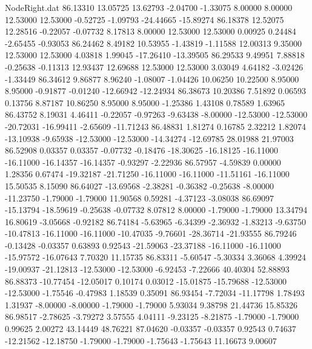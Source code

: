 \begin{filecontents}{NodeRight.dat}
  86.13310   13.05725   13.62793    -2.04700   -1.33075    8.00000    8.00000   12.53000   12.53000   -0.52725   -1.09793  -24.44665  -15.89274
  86.18378   12.52075   12.28516    -0.22057   -0.07732    8.17813    8.00000   12.53000   12.53000    0.00925    0.24484   -2.65455   -0.93053
  86.24462    8.49182   10.53955    -1.43819   -1.11588   12.00313    9.35000   12.53000   12.53000    4.03818    1.99045  -17.26410  -13.39505
  86.29533    9.49951    7.88818    -0.25638   -0.11313   12.93437   12.69688   12.53000   12.53000    3.03049    4.64182   -3.02426   -1.33449
  86.34612    9.86877    8.96240    -1.08007   -1.04426   10.06250   10.22500    8.95000    8.95000   -0.91877   -0.01240  -12.66942  -12.24934
  86.38673   10.20386    7.51892     0.06593    0.13756    8.87187   10.86250    8.95000    8.95000   -1.25386    1.43108    0.78589    1.63965
  86.43752    8.19031    4.46411    -0.22057   -0.97263   -9.63438   -8.00000  -12.53000  -12.53000  -20.72031  -16.99411   -2.65609  -11.71243
  86.48831    1.81274    0.16785     2.32212    1.82074  -13.10938   -9.65938  -12.53000  -12.53000  -14.34274  -12.69785   28.01988   21.97003
  86.52908    0.03357    0.03357    -0.07732   -0.18476  -18.30625  -16.18125  -16.11000  -16.11000  -16.14357  -16.14357   -0.93297   -2.22936
  86.57957   -4.59839    0.00000     1.28356    0.67474  -19.32187  -21.71250  -16.11000  -16.11000  -11.51161  -16.11000   15.50535    8.15090
  86.64027  -13.69568   -2.38281    -0.36382   -0.25638   -8.00000  -11.23750   -1.79000   -1.79000   11.90568    0.59281   -4.37123   -3.08038
  86.69097  -15.13794  -18.59619    -0.25638   -0.07732    8.07812    8.00000   -1.79000   -1.79000   13.34794   16.80619   -3.05668   -0.92182
  86.74184   -5.63965   -6.34399    -2.36932   -1.83213   -9.63750  -10.47813  -16.11000  -16.11000  -10.47035   -9.76601  -28.36714  -21.93555
  86.79246   -0.13428   -0.03357     0.63893    0.92543  -21.59063  -23.37188  -16.11000  -16.11000  -15.97572  -16.07643    7.70320   11.15735
  86.83311   -5.60547   -5.30334     3.36068    4.39924  -19.00937  -21.12813  -12.53000  -12.53000   -6.92453   -7.22666   40.40304   52.88893
  86.88373  -10.77454  -12.05017     0.10174    0.03012  -15.01875  -15.79688  -12.53000  -12.53000   -1.75546   -0.47983    1.18539    0.35091
  86.93454   -7.72034  -11.17798     1.78493    1.31937   -8.00000   -8.00000   -1.79000   -1.79000    5.93034    9.38798   21.44736   15.85326
  86.98517   -2.78625   -3.79272     3.57555    4.04111   -9.23125   -8.21875   -1.79000   -1.79000    0.99625    2.00272   43.14449   48.76221
  87.04620   -0.03357   -0.03357     0.92543    0.74637  -12.21562  -12.18750   -1.79000   -1.79000   -1.75643   -1.75643   11.16673    9.00607

\end{filecontents}
